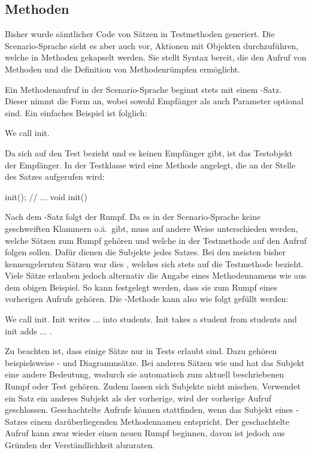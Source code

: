 \subsection{Methoden}\label{subsec:methods}

Bisher wurde sämtlicher Code von Sätzen in Testmethoden generiert.
Die Scenario-Sprache sieht es aber auch vor, Aktionen mit Objekten durchzuführen, welche in Methoden gekapselt werden.
Sie stellt Syntax bereit, die den Aufruf von Methoden und die Definition von Methodenrümpfen ermöglicht.

Ein Methodenaufruf in der Scenario-Sprache beginnt stets mit einem -Satz.
Dieser nimmt die Form  an, wobei sowohl Empfänger als auch Parameter optional sind.
Ein einfaches Beispiel ist folglich:

\begin{codeblock}
    We call init.
\end{codeblock}

Da sich  auf den Test bezieht und es keinen Empfänger gibt, ist das Testobjekt der Empfänger.
In der Testklasse wird eine Methode  angelegt, die an der Stelle des Satzes aufgerufen wird:

\begin{jcodeblock}
    init();
    // ...
    void init() {
    }
\end{jcodeblock}

Nach dem -Satz folgt der Rumpf.
Da es in der Scenario-Sprache keine geschweiften Klammern o.ä.\ gibt, muss auf andere Weise unterschieden werden, welche Sätzen zum Rumpf gehören und welche in der Testmethode auf den Aufruf folgen sollen.
Dafür dienen die Subjekte jedes Satzes.
Bei den meisten bisher kennengelernten Sätzen war dies , welches sich stets auf die Testmethode bezieht.
Viele Sätze erlauben jedoch alternativ die Angabe eines Methodennamens wie  aus dem obigen Beispiel.
So kann festgelegt werden, dass sie zum Rumpf eines vorherigen Aufrufs gehören.
Die -Methode kann also wie folgt gefüllt werden:

\begin{codeblock}
    We call init.
    Init writes ... into students.
    Init takes a student from students and init adds ... .
\end{codeblock}

Zu beachten ist, dass einige Sätze nur in Tests erlaubt sind.
Dazu gehören beispielsweise - und Diagrammsätze.
Bei anderen Sätzen wie  und  hat das Subjekt eine andere Bedeutung, wodurch sie automatisch zum aktuell beschriebenen Rumpf oder Test gehören.
Zudem lassen sich Subjekte nicht mischen.
Verwendet ein Satz ein anderes Subjekt als der vorherige, wird der vorherige Aufruf geschlossen.
Geschachtelte Aufrufe können stattfinden, wenn das Subjekt eines -Satzes einem darüberliegenden Methodennamen entspricht.
Der geschachtelte Aufruf kann zwar wieder einen neuen Rumpf beginnen, davon ist jedoch aus Gründen der Verständlichkeit abzuraten.


